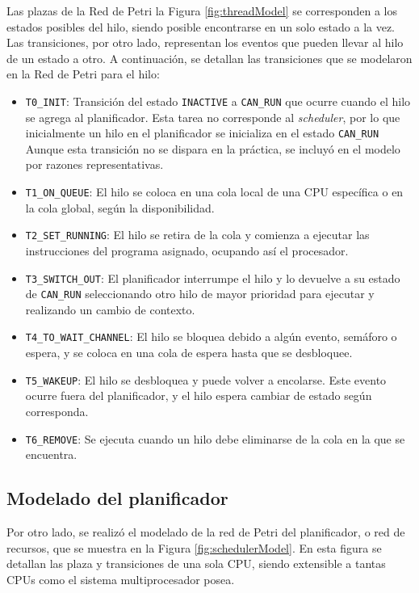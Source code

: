 Las plazas de la Red de Petri la Figura \ref{fig:threadModel} se corresponden a los estados posibles del hilo, siendo posible encontrarse en un solo estado a la vez. Las transiciones, por otro lado, representan los eventos que pueden llevar al hilo de un estado a otro. A continuación, se detallan las transiciones que se modelaron en la Red de Petri para el hilo:

\begin{itemize}
    \item \verb|T0_INIT|: Transición del estado \verb|INACTIVE| a \verb|CAN_RUN| que ocurre cuando el hilo se agrega al planificador. Esta tarea no corresponde al \textit{scheduler}, por lo que inicialmente un hilo en el planificador se inicializa en el estado \verb|CAN_RUN| Aunque esta transición no se dispara en la práctica, se incluyó en el modelo por razones representativas.
    \item \verb|T1_ON_QUEUE|: El hilo se coloca en una cola local de una CPU específica o en la cola global, según la disponibilidad.
    \item \verb|T2_SET_RUNNING|: El hilo se retira de la cola y comienza a ejecutar las instrucciones del programa asignado, ocupando así el procesador.
    \item \verb|T3_SWITCH_OUT|: El planificador interrumpe el hilo y lo devuelve a su estado de \verb|CAN_RUN| seleccionando otro hilo de mayor prioridad para ejecutar y realizando un cambio de contexto.
    \item \verb|T4_TO_WAIT_CHANNEL|: El hilo se bloquea debido a algún evento, semáforo o espera, y se coloca en una cola de espera hasta que se desbloquee.
    \item \verb|T5_WAKEUP|: El hilo se desbloquea y puede volver a encolarse. Este evento ocurre fuera del planificador, y el hilo espera cambiar de estado según corresponda.
    \item \verb|T6_REMOVE|: Se ejecuta cuando un hilo debe eliminarse de la cola en la que se encuentra.
\end{itemize}


\subsection{Modelado del planificador}

Por otro lado, se realizó el modelado de la red de Petri del planificador, o red de recursos, que se muestra en la Figura \ref{fig:schedulerModel}. En esta figura se detallan las plaza y transiciones de una sola CPU, siendo extensible a tantas CPUs como el sistema multiprocesador posea.

